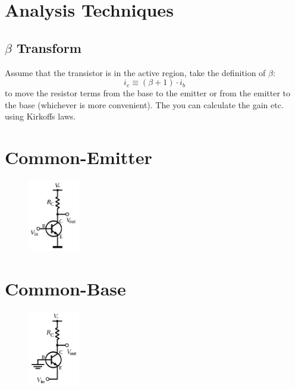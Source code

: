 \documentclass{report}
\newcommand{\imwidth}{0.2\textwidth}
\begin{document}
\section{Analysis Techniques}
\subsection{$\beta$ Transform}
Assume that the transistor is in the active region, take the definition of $\beta$:
\begin{equation}
    \label{eqn:beta}
    i_{e} \equiv (\beta + 1) \cdot i_{b}
\end{equation}
to move the resistor terms from the base to the emitter or from the emitter to the base (whichever is more convenient).
The you can calculate the gain etc. using Kirkoffs laws.

\section{Common-Emitter}
\begin{figure}
\centering
\includegraphics[width = \imwidth]{NPN_common_emitter}
\caption{}
\end{figure}

\section{Common-Base}
\begin{figure}
\centering
\includegraphics[width = \imwidth]{NPN_common_base}
\caption{}
\end{figure}
\end{document}
